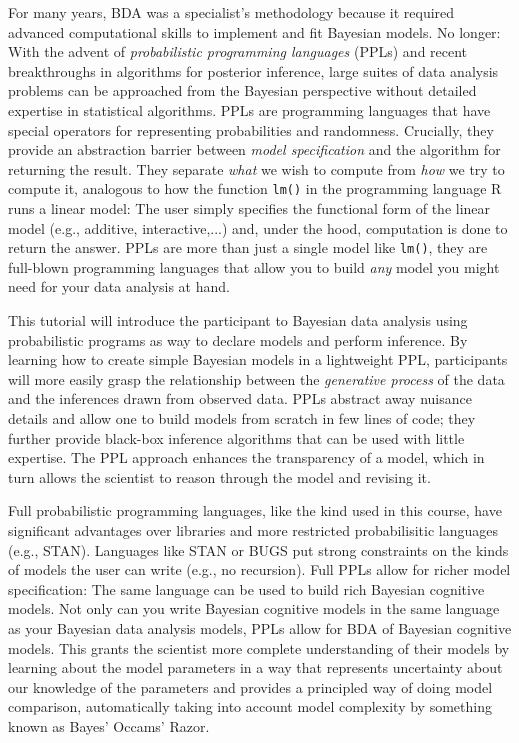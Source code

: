\documentclass[10pt,letterpaper]{article}
\newcommand{\ndg}[1]{\textcolor{green}{[ndg: #1]}}
\begin{document}
For many years, BDA was a specialist's methodology because it required advanced computational skills to implement and fit Bayesian models.
No longer: With the advent of \emph{probabilistic programming languages} (PPLs) and recent breakthroughs in algorithms for posterior inference, large suites of data analysis problems can be approached from the Bayesian perspective without detailed expertise in statistical algorithms. 
PPLs are programming languages that have special operators for representing probabilities and randomness. 
Crucially, they provide an abstraction barrier between \emph{model specification} and the algorithm for returning the result.
They separate \emph{what} we wish to compute from  \emph{how} we try to compute it, analogous to how the function \lstinline{lm()} in the programming language R runs a linear model: The user simply specifies the functional form of the linear model (e.g., additive, interactive,...) and, under the hood, computation is done to return the answer.
PPLs are more than just a single model like \lstinline{lm()}, they are full-blown programming languages that allow you to build \emph{any} model you might need for your data analysis at hand.

This tutorial will introduce the participant to Bayesian data analysis using probabilistic programs as way to declare models and perform inference. 
By learning how to create simple Bayesian models in a lightweight PPL, participants will more easily grasp the relationship between the \emph{generative process} of the data and the inferences drawn from observed data.
PPLs abstract away nuisance details and allow one to build models from scratch in few lines of code; they further provide black-box inference algorithms that can be used with little expertise.
The PPL approach enhances the transparency of a model, which in turn allows the scientist to reason through the model and revising it. 

Full probabilistic programming languages, like the kind used in this course, have significant advantages over libraries and more restricted probabilisitic languages (e.g., STAN).  
Languages like STAN or BUGS put strong constraints on the kinds of models the user can write (e.g., no recursion). 
Full PPLs allow for richer model specification: The same language can be used to build rich Bayesian cognitive models. 
Not only can you write Bayesian cognitive models in the same language as your Bayesian data analysis models, PPLs allow for BDA of Bayesian cognitive models. 
This grants the scientist more complete understanding of their models by learning about the model parameters in a way that represents uncertainty about our knowledge of the parameters and provides a principled way of doing model comparison, automatically taking into account model complexity by something known as Bayes' Occams' Razor.
\end{document}
